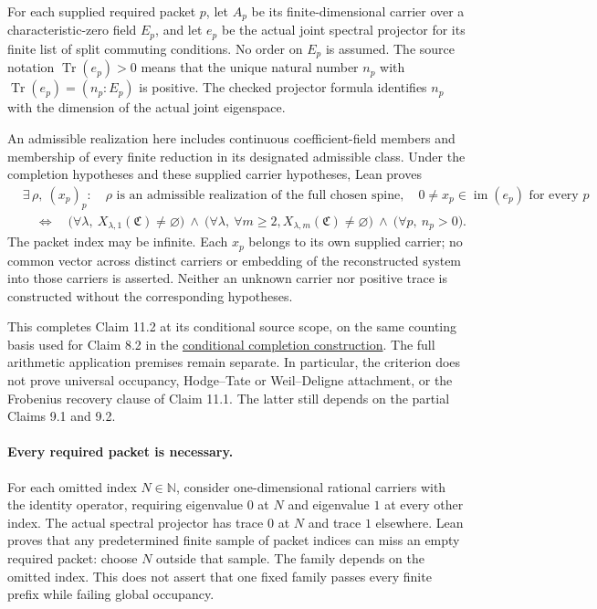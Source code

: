 \documentclass[11pt]{article}
\theoremstyle{definition}
\theoremstyle{remark}
\newcommand{\Tr}{\operatorname{Tr}}
\newcommand{\Compat}{\mathfrak C}
\begin{document}
For each supplied required packet $p$, let $A_p$ be its finite-dimensional carrier
over a characteristic-zero field $E_p$, and let $e_p$ be the actual joint spectral
projector for its finite list of split commuting conditions. No order on $E_p$
is assumed. The source notation $\Tr(e_p)>0$ means that the unique natural number
$n_p$ with $\Tr(e_p)=(n_p:E_p)$ is positive. The checked projector formula identifies
$n_p$ with the dimension of the actual joint eigenspace.

An admissible realization here includes continuous coefficient-field members and
membership of every finite reduction in its designated admissible class.
Under the completion hypotheses and these supplied carrier hypotheses, Lean proves
\[
\begin{aligned}
&\exists\,\rho,\ (x_p)_p:\quad
  \rho\text{ is an admissible realization of the full chosen spine},\quad
  0\ne x_p\in\operatorname{im}(e_p)\text{ for every }p\\
&\quad\Longleftrightarrow\quad
 \bigl(\forall\lambda,\ X_{\lambda,1}(\Compat)\ne\varnothing\bigr)
 \ \land\ \bigl(\forall\lambda,\ \forall m\ge2,
               X_{\lambda,m}(\Compat)\ne\varnothing\bigr)
 \ \land\ \bigl(\forall p,\ n_p>0\bigr).
\end{aligned}
\]
The packet index may be infinite. Each $x_p$ belongs to its own supplied carrier;
no common vector across distinct carriers or embedding of the reconstructed
system into those carriers is asserted. Neither an unknown carrier nor positive
trace is constructed without the corresponding hypotheses.

This completes Claim 11.2 at its conditional source scope, on the same counting
basis used for Claim 8.2 in the \hyperref[book:x-construction-23]{conditional completion construction}. The full arithmetic application premises
remain separate. In particular, the criterion does not prove universal occupancy,
Hodge--Tate or Weil--Deligne attachment, or the Frobenius recovery clause of
Claim 11.1. The latter still depends on the partial Claims 9.1 and 9.2.

\paragraph{Every required packet is necessary.}
For each omitted index $N\in\mathbb N$, consider one-dimensional rational carriers
with the identity operator, requiring eigenvalue $0$ at $N$ and eigenvalue $1$
at every other index. The actual spectral projector has trace $0$ at $N$ and
trace $1$ elsewhere. Lean proves that any predetermined finite sample of packet
indices can miss an empty required packet: choose $N$ outside that sample.
The family depends on the omitted index. This does not assert that one fixed
family passes every finite prefix while failing global occupancy.
\end{document}
